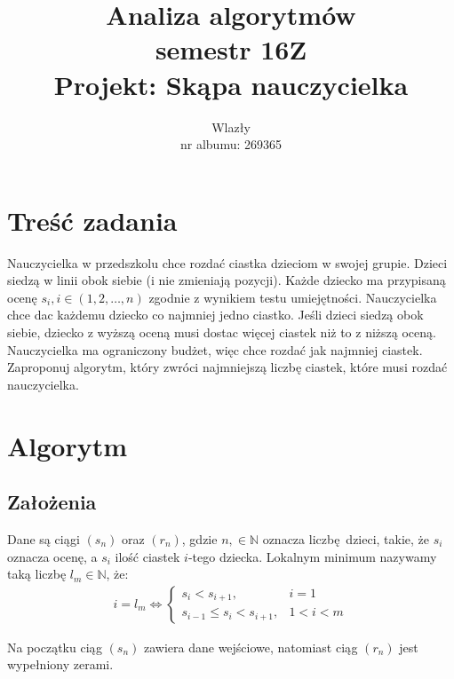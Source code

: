 \documentclass{article}
\title{\vspace{7cm}\LARGE Analiza algorytmów\\semestr 16Z\\Projekt: Skąpa nauczycielka}
\author{\LargeŁukasz Wlazły\\nr albumu: 269365}
\date{}
\begin{document}
	\maketitle
	\newpage

	\section{Treść zadania}

	Nauczycielka w przedszkolu chce rozdać ciastka dzieciom w swojej grupie. Dzieci siedzą w linii obok siebie (i nie zmieniają pozycji). Każde dziecko ma przypisaną ocenę $  s_{i}, i \in (1, 2, \ldots, n) $ zgodnie z wynikiem testu umiejętności.
	Nauczycielka chce dac każdemu dziecko co najmniej jedno ciastko. Jeśli dzieci siedzą obok siebie, dziecko z wyższą oceną musi dostac więcej ciastek niż to z niższą oceną. Nauczycielka ma ograniczony budżet, więc chce rozdać jak najmniej ciastek. Zaproponuj algorytm, który zwróci najmniejszą liczbę ciastek, które musi rozdać nauczycielka.

	\section{Algorytm}

	\subsection{Założenia}

	Dane są ciągi $(s_{n})$ oraz $(r_{n})$, gdzie $n, \in \mathbb{N}$ oznacza liczbę dzieci, takie, że $s_{i}$ oznacza ocenę, a $s_{i}$ ilość ciastek $i$-tego dziecka.
	Lokalnym minimum nazywamy taką liczbę $l_m\in\mathbb{N}$, że:
	\begin{align*}
		i = l_m \Leftrightarrow
		\begin{cases}
			s_{i} < s_{i + 1}, & i = 1 \\
			s_{i-1} \leq s_{i} < s_{i+1}, & 1 < i < m
		\end{cases}
	\end{align*}

	Na początku ciąg $(s_{n})$ zawiera dane wejściowe, natomiast ciąg $(r_{n})$ jest wypełniony zerami. \\
\end{document}
